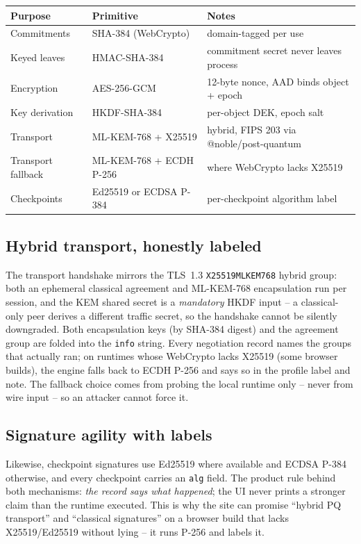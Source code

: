 \documentclass[11pt]{article}
\newcommand{\code}[1]{\texttt{#1}}
\begin{document}
\begin{center}
\begin{tabular}{@{}llp{7.6cm}@{}}
\toprule
Purpose & Primitive & Notes \\
\midrule
Commitments & SHA-384 (WebCrypto) & domain-tagged per use \\
Keyed leaves & HMAC-SHA-384 & commitment secret never leaves process \\
Encryption & AES-256-GCM & 12-byte nonce, AAD binds object + epoch \\
Key derivation & HKDF-SHA-384 & per-object DEK, epoch salt \\
Transport & ML-KEM-768 + X25519 & hybrid, FIPS 203 via @noble/post-quantum \\
Transport fallback & ML-KEM-768 + ECDH P-256 & where WebCrypto lacks X25519 \\
Checkpoints & Ed25519 or ECDSA P-384 & per-checkpoint algorithm label \\
\bottomrule
\end{tabular}
\end{center}

\subsection{Hybrid transport, honestly labeled}
The transport handshake mirrors the TLS~1.3 \code{X25519MLKEM768} hybrid
group: both an ephemeral classical agreement and ML-KEM-768 encapsulation run
per session, and the KEM shared secret is a \emph{mandatory} HKDF input --
a classical-only peer derives a different traffic secret, so the handshake
cannot be silently downgraded. Both encapsulation keys (by SHA-384 digest)
and the agreement group are folded into the \code{info} string. Every
negotiation record names the groups that actually ran; on runtimes whose
WebCrypto lacks X25519 (some browser builds), the engine falls back to
ECDH P-256 and says so in the profile label and note. The fallback choice
comes from probing the local runtime only -- never from wire input -- so an
attacker cannot force it.

\subsection{Signature agility with labels}
Likewise, checkpoint signatures use Ed25519 where available and ECDSA
P-384 otherwise, and every checkpoint carries an \code{alg} field. The
product rule behind both mechanisms: \emph{the record says what happened};
the UI never prints a stronger claim than the runtime executed. This is why
the site can promise ``hybrid PQ transport'' and ``classical
signatures'' on a browser build that lacks X25519/Ed25519 without lying --
it runs P-256 and labels it.
\end{document}
